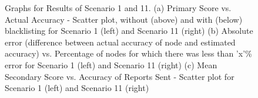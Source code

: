 \documentclass[journal]{IEEEtran}
\begin{document}
\begin{figure}[!ht]
	\caption{Graphs for Results of Scenario 1 and 11. (a) Primary Score vs. Actual Accuracy - Scatter plot, without (above) and with (below) blacklisting for Scenario 1 (left) and Scenario 11 (right) (b) Absolute error (difference between actual accuracy of node and estimated accuracy) vs. Percentage of nodes for which there was less than 'x'\% error for Scenario 1 (left) and Scenario 11 (right) (c) Mean Secondary Score vs. Accuracy of Reports Sent - Scatter plot for Scenario 1 (left) and Scenario 11 (right)}
	\label{fig:apdx:ev1}
	\centering
\end{figure}
\end{document}
